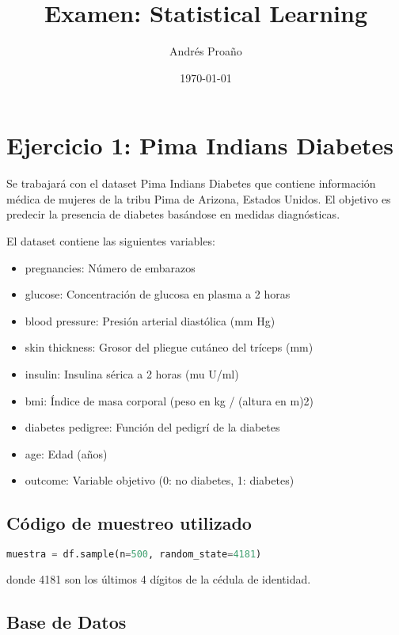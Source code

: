 \documentclass[12pt,a4paper]{article}
\title{\textbf{Examen: Statistical Learning}}
\author{Andrés Proaño}
\date{\today}
\begin{document}
\maketitle

\section{Ejercicio 1: Pima Indians Diabetes}

Se trabajará con el dataset Pima Indians Diabetes que contiene información médica de mujeres de
la tribu Pima de Arizona, Estados Unidos. El objetivo es predecir la presencia de diabetes basándose en
medidas diagnósticas.

El dataset contiene las siguientes variables:
\begin{itemize}
\item pregnancies: Número de embarazos
\item glucose: Concentración de glucosa en plasma a 2 horas
\item blood pressure: Presión arterial diastólica (mm Hg)
\item skin thickness: Grosor del pliegue cutáneo del tríceps (mm)
\item insulin: Insulina sérica a 2 horas (mu U/ml)
\item bmi: Índice de masa corporal (peso en kg / (altura en m)2)
\item diabetes pedigree: Función del pedigrí de la diabetes
\item age: Edad (años)
\item outcome: Variable objetivo (0: no diabetes, 1: diabetes)
\end{itemize}

\subsection{Código de muestreo utilizado}

\begin{lstlisting}[language=Python, frame=single, basicstyle=\ttfamily\small, breaklines=true]
muestra = df.sample(n=500, random_state=4181)
\end{lstlisting}

donde 4181 son los últimos 4 dígitos de la cédula de identidad.

\subsection{Base de Datos}
\end{document}
